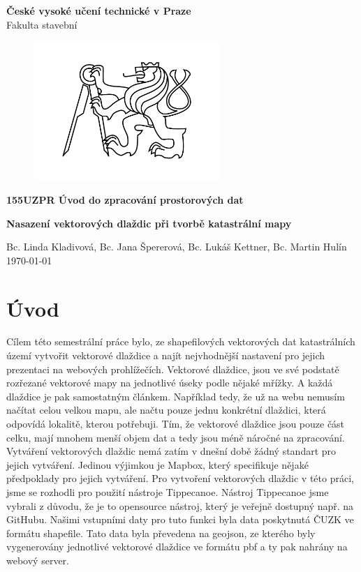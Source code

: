 \documentclass[12pt]{article}
\begin{document}
\begin{titlepage}
\centering
\Large \textbf{České vysoké učení technické v Praze }\\ Fakulta stavební
\vspace{2cm}

\begin{figure}[h!] %
\centering
\includegraphics[width=7cm]{./img/cvut.png}
\end{figure}
 
\Large \textbf{155UZPR Úvod do zpracování prostorových dat}
\vspace{1cm}

\LARGE  \textbf{ Nasazení vektorových dlaždic při tvorbě katastrální mapy}
\vspace{3cm}

\Large Bc. Linda Kladivová, Bc. Jana Špererová, Bc. Lukáš Kettner, Bc. Martin Hulín \\ \today

 \thispagestyle{empty} %
\end{titlepage}

\tableofcontents    %
\newpage %
\section{Úvod}
Cílem této semestrální práce bylo, ze shapefilových vektorových dat katastrálních území vytvořit vektorové dlaždice a najít nejvhodnější nastavení pro jejich prezentaci na webových prohlížečích.
Vektorové dlaždice, jsou ve své podstatě rozřezané vektorové mapy na jednotlivé úseky podle nějaké mřížky. A každá dlaždice je pak samostatným článkem. Například tedy, že už na webu nemusím načítat celou velkou mapu, ale načtu pouze jednu konkrétní dlaždici, která odpovídá lokalitě, kterou potřebuji. Tím, že vektorové dlaždice jsou pouze část celku, mají mnohem menší objem dat a tedy jsou méně náročné na zpracování.
Vytváření vektorových dlaždic nemá zatím v dnešní době žádný standart pro jejich vytváření. Jedinou výjimkou je Mapbox, který specifikuje nějaké předpoklady pro jejich vytváření. Pro vytvoření vektorových dlaždic v této práci, jsme se rozhodli pro použití nástroje Tippecanoe.
Nástroj Tippecanoe jsme vybrali z důvodu, že je to opensource nástroj, který je veřejně dostupný např. na GitHubu. Našimi vstupními daty pro tuto funkci byla data poskytnutá ČUZK ve formátu shapefile. Tato data byla převedena na geojson, ze kterého byly vygenerovány jednotlivé vektorové dlaždice ve formátu pbf a ty pak nahrány na webový server.
\end{document}
